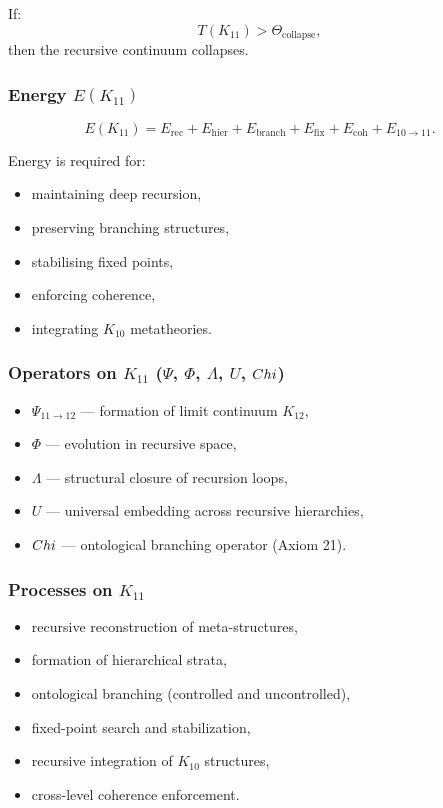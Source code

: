 If:
\[
T(K_{11}) > \Theta_{\mathrm{collapse}},
\]
then the recursive continuum collapses.

\subsubsection{Energy $E(K_{11})$}

\[
E(K_{11})=
E_{\mathrm{rec}}+
E_{\mathrm{hier}}+
E_{\mathrm{branch}}+
E_{\mathrm{fix}}+
E_{\mathrm{coh}}+
E_{10\to11}.
\]

Energy is required for:
\begin{itemize}
    \item maintaining deep recursion,
    \item preserving branching structures,
    \item stabilising fixed points,
    \item enforcing coherence,
    \item integrating $K_{10}$ metatheories.
\end{itemize}

\subsubsection{Operators on $K_{11}$ ($\Psi$, $\Phi$, $\Lambda$, $U$, $Chi$)}

\begin{itemize}
    \item $\Psi_{11\to12}$ — formation of limit continuum $K_{12}$,
    \item $\Phi$ — evolution in recursive space,
    \item $\Lambda$ — structural closure of recursion loops,
    \item $U$ — universal embedding across recursive hierarchies,
    \item $Chi$ — ontological branching operator (Axiom 21).
\end{itemize}

\subsubsection{Processes on $K_{11}$}

\begin{itemize}
    \item recursive reconstruction of meta-structures,
    \item formation of hierarchical strata,
    \item ontological branching (controlled and uncontrolled),
    \item fixed-point search and stabilization,
    \item recursive integration of $K_{10}$ structures,
    \item cross-level coherence enforcement.
\end{itemize}

